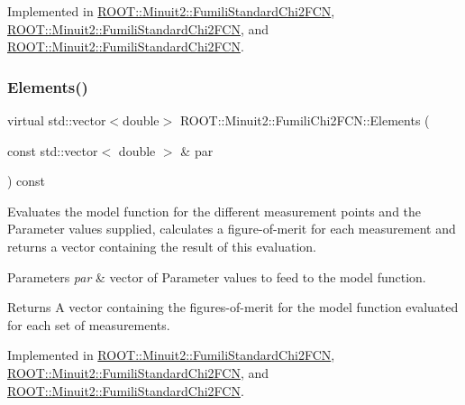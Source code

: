 Implemented in \mbox{\hyperlink{classROOT_1_1Minuit2_1_1FumiliStandardChi2FCN_ae7683cdbfa4160902add963d2132ab76}{R\+O\+O\+T\+::\+Minuit2\+::\+Fumili\+Standard\+Chi2\+F\+CN}}, \mbox{\hyperlink{classROOT_1_1Minuit2_1_1FumiliStandardChi2FCN_ab05d3fe2dcb9b1c56b6753debe5e0064}{R\+O\+O\+T\+::\+Minuit2\+::\+Fumili\+Standard\+Chi2\+F\+CN}}, and \mbox{\hyperlink{classROOT_1_1Minuit2_1_1FumiliStandardChi2FCN_ab05d3fe2dcb9b1c56b6753debe5e0064}{R\+O\+O\+T\+::\+Minuit2\+::\+Fumili\+Standard\+Chi2\+F\+CN}}.

\mbox{\label{classROOT_1_1Minuit2_1_1FumiliChi2FCN_a25cc8dcc2eff831b3c0a94bf5413c2cd}} 
\subsubsection{\texorpdfstring{Elements()}{Elements()}\hspace{0.1cm}{\footnotesize\ttfamily [3/3]}}
{\footnotesize\ttfamily virtual std\+::vector$<$double$>$ R\+O\+O\+T\+::\+Minuit2\+::\+Fumili\+Chi2\+F\+C\+N\+::\+Elements (\begin{DoxyParamCaption}\item[{const std\+::vector$<$ double $>$ \&}]{par }\end{DoxyParamCaption}) const\hspace{0.3cm}{\ttfamily [pure virtual]}}

Evaluates the model function for the different measurement points and the Parameter values supplied, calculates a figure-\/of-\/merit for each measurement and returns a vector containing the result of this evaluation.


\begin{DoxyParams}{Parameters}
{\em par} & vector of Parameter values to feed to the model function.\\
\hline
\end{DoxyParams}
\begin{DoxyReturn}{Returns}
A vector containing the figures-\/of-\/merit for the model function evaluated for each set of measurements. 
\end{DoxyReturn}


Implemented in \mbox{\hyperlink{classROOT_1_1Minuit2_1_1FumiliStandardChi2FCN_ae7683cdbfa4160902add963d2132ab76}{R\+O\+O\+T\+::\+Minuit2\+::\+Fumili\+Standard\+Chi2\+F\+CN}}, \mbox{\hyperlink{classROOT_1_1Minuit2_1_1FumiliStandardChi2FCN_ab05d3fe2dcb9b1c56b6753debe5e0064}{R\+O\+O\+T\+::\+Minuit2\+::\+Fumili\+Standard\+Chi2\+F\+CN}}, and \mbox{\hyperlink{classROOT_1_1Minuit2_1_1FumiliStandardChi2FCN_ab05d3fe2dcb9b1c56b6753debe5e0064}{R\+O\+O\+T\+::\+Minuit2\+::\+Fumili\+Standard\+Chi2\+F\+CN}}.


